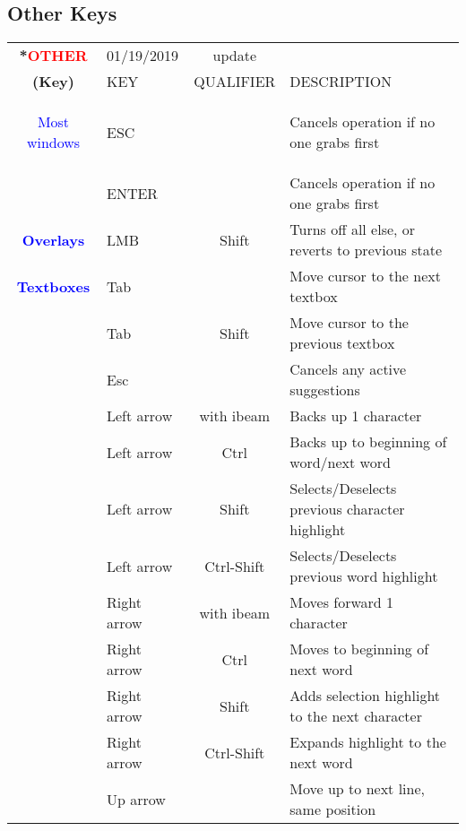 
\subsection{Other Keys }%
\label{ssec:other_keys}

\begin{center}
    \small 
    \begin{longtable}{ >{\bfseries}c l c p{6cm}}             
        \toprule
        \multirow{2}*{\textcolor{red}{OTHER}} & 01/19/2019 & update & \\
        \noalign{\smallskip}
        \cline{2-4}
        \noalign{\smallskip}
        (Key) & KEY & QUALIFIER & DESCRIPTION\\
        \midrule        
        \endhead   
        
        \textcolor{blue}{Most windows} & ESC &  & Cancels operation if no one grabs first \\                
        & ENTER &  & Cancels operation if no one grabs first \\
        \midrule
        \textcolor{blue}{Overlays} & LMB & Shift & Turns off all else, or reverts to previous state \\
        \midrule
        \textcolor{blue}{Textboxes} & Tab &  & Move cursor to the next textbox \\
        & Tab & Shift & Move cursor to the previous textbox \\        
        & Esc &  & Cancels any active suggestions \\        
        & Left arrow & with ibeam & Backs up 1 character \\        
        & Left arrow & Ctrl & Backs up to beginning of word/next word \\        
        & Left arrow & Shift & Selects/Deselects previous character highlight \\        
        & Left arrow & Ctrl-Shift & Selects/Deselects previous word highlight \\        
        & Right arrow & with ibeam & Moves forward 1 character \\        
        & Right arrow & Ctrl & Moves to beginning of next word \\        
        & Right arrow & Shift & Adds selection highlight to the next character \\        
        & Right arrow & Ctrl-Shift & Expands highlight to the next word \\        
        & Up arrow &  & Move up to next line, same position \\        

\end{longtable}
\end{center}

